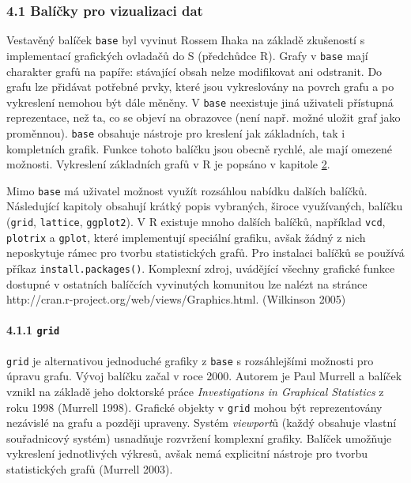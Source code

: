 \documentclass[12pt,]{article}
\let\oldparagraph\paragraph
\renewcommand{\paragraph}[1]{\oldparagraph{#1}\mbox{}}
\begin{document}
\hypertarget{baseviz}{\subsubsection{4.1 Balíčky pro vizualizaci
dat}\label{baseviz}}

\qquad Vestavěný balíček \texttt{base} byl vyvinut Rossem Ihaka na
základě zkušeností s implementací grafických ovladačů do S (předchůdce
R). Grafy v \texttt{base} mají charakter grafů na papíře: stávající
obsah nelze modifikovat ani odstranit. Do grafu lze přidávat potřebné
prvky, které jsou vykreslovány na povrch grafu a po vykreslení nemohou
být dále měněny. V \texttt{base} neexistuje jiná uživateli přístupná
reprezentace, než ta, co se objeví na obrazovce (není např. možné uložit
graf jako proměnnou). \texttt{base} obsahuje nástroje pro kreslení jak
základních, tak i kompletních grafik. Funkce tohoto balíčku jsou obecně
rychlé, ale mají omezené možnosti. Vykreslení základních grafů v R je
popsáno v kapitole \protect\hyperlink{base}{2}.

\qquad Mimo \texttt{base} má uživatel možnost využít rozsáhlou nabídku
dalších balíčků. Následující kapitoly obsahují krátký popis vybraných,
široce využívaných, balíčku (\texttt{grid}, \texttt{lattice},
\texttt{ggplot2}). V R existuje mnoho dalších balíčků, například
\texttt{vcd}, \texttt{plotrix} a \texttt{gplot}, které implementují
speciální grafiku, avšak žádný z nich neposkytuje rámec pro tvorbu
statistických grafů. Pro instalaci balíčků se používá příkaz
\texttt{install.packages()}. Komplexní zdroj, uvádějící všechny grafické
funkce dostupné v ostatních balíčcích vyvinutých komunitou lze nalézt na
stránce \mbox{http://cran.r-project.org/web/views/Graphics.html}.
(Wilkinson 2005)

\paragraph{\texorpdfstring{4.1.1 \texttt{grid}}{4.1.1 grid}}\label{grid}

\qquad \texttt{grid} je alternativou jednoduché grafiky z \texttt{base}
s rozsáhlejšími možnosti pro úpravu grafu. Vývoj balíčku začal v roce
2000. Autorem je Paul Murrell a balíček vznikl na základě jeho doktorské
práce \emph{Investigations in Graphical Statistics} z roku 1998 (Murrell
1998). Grafické objekty v \texttt{grid} mohou být reprezentovány
nezávislé na grafu a později upraveny. Systém \emph{viewport}ů (každý
obsahuje vlastní souřadnicový systém) usnadňuje rozvržení komplexní
grafiky. Balíček umožňuje vykreslení jednotlivých výkresů, avšak nemá
explicitní nástroje pro tvorbu statistických grafů (Murrell 2003).
\end{document}
